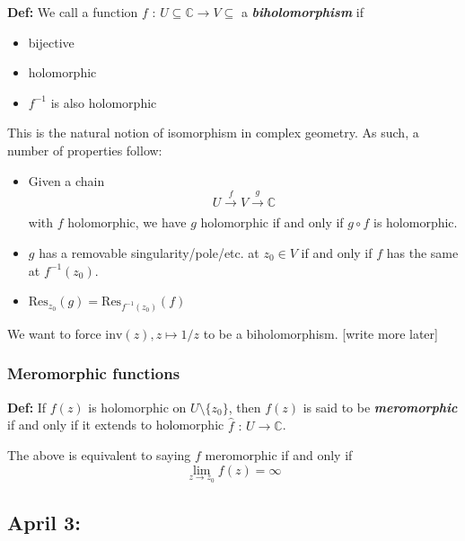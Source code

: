 \documentclass[11pt]{article}
\newcommand{\C}{\mathbb{C}}
\begin{document}
\vskip 0.5cm
\begin{bluebox}
    \textbf{Def:} We call a function $f \text{ : } U \subseteq \C \rightarrow V \subseteq$ a \emph{\textbf{biholomorphism}} if 
    \begin{itemize}
        \item bijective
        \item holomorphic
        \item $f^{-1}$ is also holomorphic
    \end{itemize}
\end{bluebox}

This is the natural notion of isomorphism in complex geometry. As such, a number of properties follow:

\begin{redbox}
    \begin{itemize}
        \item Given a chain
        \[ U \xrightarrow[]{f} V \xrightarrow[]{g} \C \] with $f$ holomorphic, we have $g$ holomorphic if and only if $g \circ f$ is holomorphic.
        \item $g$ has a removable singularity/pole/etc. at $z_0 \in V$ if and only if $f$ has the same at $f^{-1}(z_0)$.
        \item $\mathrm{Res}_{z_0}(g) = \mathrm{Res}_{f^{-1}(z_0)}(f)$
    \end{itemize}
\end{redbox}

\vskip 0.5cm
We want to force $\mathrm{inv}(z), z \mapsto 1/z$ to be a biholomorphism. [write more later]

\vskip 0.5cm
\subsubsection{Meromorphic functions}

\vskip 0.5cm
\begin{bluebox}
    \textbf{Def:} If $f(z)$ is holomorphic on $U \setminus \{z_0\}$, then $f(z)$ is said to be \emph{\textbf{meromorphic}} if and only if it extends to holomorphic $\hat{f} \text{ : } U \rightarrow \hat{\C}$. 

    \vskip 0.5cm
    The above is equivalent to saying $f$ meromorphic if and only if 
    \[ \lim_{z \rightarrow z_0} f(z) = \infty \]
\end{bluebox}


\pagebreak
\subsection{April 3: }
\end{document}
